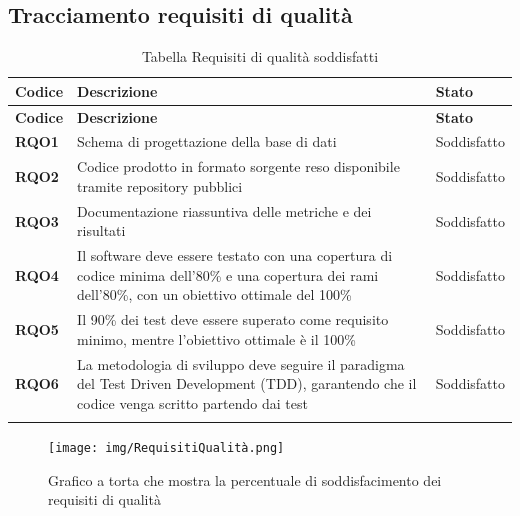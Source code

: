 \newpage
\subsection{Tracciamento requisiti di qualità}

\begin{longtable}{|>{\centering\arraybackslash}m{}|>{\centering\arraybackslash}m{}|>{\centering\arraybackslash}m{}|}
	\hline
	\textbf{Codice} & \textbf{Descrizione} & \textbf{Stato}\\\hline
	\endfirsthead
	\hline
	\textbf{Codice} & \textbf{Descrizione} & \textbf{Stato}\\\hline
	\endhead
	\hline
    \textbf{RQO1} & Schema di progettazione della base di dati & Soddisfatto \\
    \hline
    \textbf{RQO2} & Codice prodotto in formato sorgente reso disponibile tramite repository pubblici & Soddisfatto \\
    \hline
    \textbf{RQO3} & Documentazione riassuntiva delle metriche e dei risultati & Soddisfatto \\
    \hline
    \textbf{RQO4} & Il software deve essere testato con una copertura di codice minima dell'80\% e una copertura dei rami dell'80\%, con un obiettivo ottimale del 100\% & Soddisfatto \\
    \hline
    \textbf{RQO5} & Il 90\% dei test deve essere superato come requisito minimo, mentre l'obiettivo ottimale è il 100\% & Soddisfatto \\
    \hline
    \textbf{RQO6} & La metodologia di sviluppo deve seguire il paradigma del Test Driven Development (TDD), garantendo che il codice venga scritto partendo dai test & Soddisfatto \\
    \hline

\caption{Tabella Requisiti di qualità soddisfatti}
\end{longtable}

\begin{figure}[H]
    \centering
    \texttt{[image: img/RequisitiQualità.png]}
    \caption{Grafico a torta che mostra la percentuale di soddisfacimento dei requisiti di qualità}
\end{figure}
\newpage


